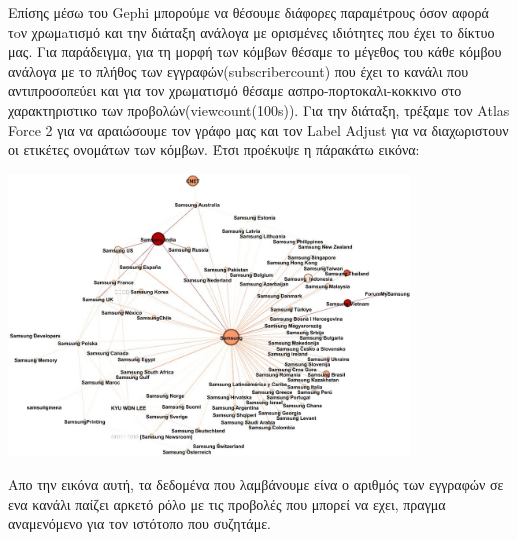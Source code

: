 \documentclass[12pt]{article}
\begin{document}
	Επίσης μέσω του Gephi μπορούμε να θέσουμε διάφορες παραμέτρους όσον αφορά τoν χρωμaτισμό και την διάταξη ανάλογα με ορισμένες ιδιότητες που έχει το δίκτυο μας. Για παράδειγμα, για τη μορφή των κόμβων θέσαμε το μέγεθος του κάθε κόμβου ανάλογα με το πλήθος των εγγραφών(subscribercount) που έχει το κανάλι που αντιπροσοπεύει και για τον χρωματισμό θέσαμε ασπρο-πορτοκαλι-κοκκινο στο χαρακτηριστικο των προβολών(viewcount(100s)). Για την διάταξη, τρέξαμε τον Atlas Force 2 για να αραιώσουμε τον γράφο μας και τον Label Adjust για να διαχωριστουν οι ετικέτες ονομάτων των κόμβων. Έτσι προέκυψε η πάρακάτω εικόνα:
		\begin{center}
			\includegraphics[width=0.8\textwidth]{photos-files/section3/second_painting.jpg}
		\end{center}
	Απο την εικόνα αυτή, τα δεδομένα που λαμβάνουμε είνα ο αριθμός των εγγραφών σε ενα κανάλι παίζει αρκετό ρόλο με τις προβολές που μπορεί να εχει, πραγμα αναμενόμενο για τον ιστότοπο που συζητάμε.
	\newpage
	
\end{document}
